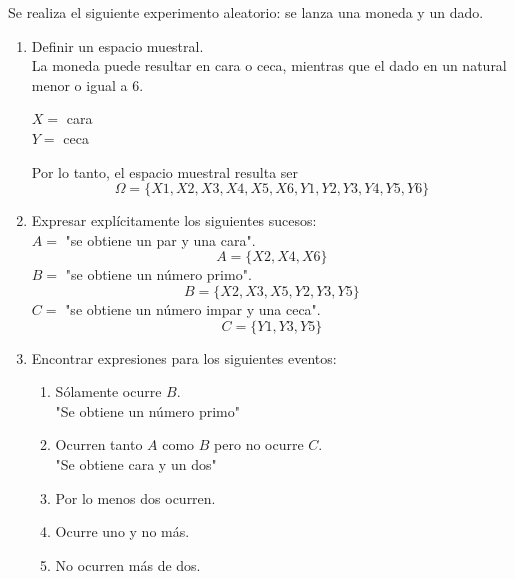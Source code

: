 \item Se realiza el siguiente experimento aleatorio: se lanza una moneda y un dado.
    \begin{enumerate}
        \item Definir un espacio muestral.\e\\
            La moneda puede resultar en cara o ceca, mientras que el dado en un natural menor o igual a 6.
            \begin{center}
                $X=$ cara\\
                $Y=$ ceca\\
            \end{center}
            Por lo tanto, el espacio muestral resulta ser\[\Omega=\{X1,X2,X3,X4,X5,X6,Y1,Y2,Y3,Y4,Y5,Y6\}\]
        \item Expresar explícitamente los siguientes sucesos:\\
            $A=$ "se obtiene un par y una cara".
            \[A=\{X2,X4,X6\}\]
            $B=$ "se obtiene un número primo".
            \[B=\{X2,X3,X5,Y2,Y3,Y5\}\]
            $C=$ "se obtiene un número impar y una ceca".
            \[C=\{Y1,Y3,Y5\}\]
        \item Encontrar expresiones para los siguientes eventos:
            \begin{enumerate}
                \item Sólamente ocurre $B$.\e\\
                    "Se obtiene un número primo"\e
                \item Ocurren tanto $A$ como $B$ pero no ocurre $C$.\e\\
                    "Se obtiene cara y un dos"\e
                \item Por lo menos dos ocurren.
                \item Ocurre uno y no más.
                \item No ocurren más de dos.
            \end{enumerate}
    \end{enumerate}
